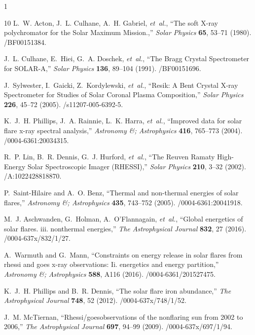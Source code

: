 \documentclass[12pt]{spieman}  %
\newcommand{\solphys}{Solar Physics}
\begin{document}
\begin{spacing}{1}
\begin{thebibliography}{10}
L.~W. {Acton}, J.~L. {Culhane}, A.~H. {Gabriel}, {\em et~al.}, ``{The soft X-ray polychromator for the Solar Maximum Mission.},'' {\em \solphys} {\bf 65}, 53--71  (1980).
/BF00151384.

J.~L. {Culhane}, E.~{Hiei}, G.~A. {Doschek}, {\em et~al.}, ``{The Bragg Crystal Spectrometer for SOLAR-A},'' {\em \solphys} {\bf 136}, 89--104  (1991).
/BF00151696.

J.~{Sylwester}, I.~{Gaicki}, Z.~{Kordylewski}, {\em et~al.}, ``{Resik: A Bent Crystal X-ray Spectrometer for Studies of Solar Coronal Plasma Composition},'' {\em \solphys} {\bf 226}, 45--72  (2005).
/s11207-005-6392-5.

K.~J.~H. Phillips, J.~A. Rainnie, L.~K. Harra, {\em et~al.}, ``Improved data for solar flare x-ray spectral analysis,'' {\em Astronomy \&; Astrophysics} {\bf 416}, 765–773  (2004).
/0004-6361:20034315.

R.~P. {Lin}, B.~R. {Dennis}, G.~J. {Hurford}, {\em et~al.}, ``{The Reuven Ramaty High-Energy Solar Spectroscopic Imager (RHESSI)},'' {\em \solphys} {\bf 210}, 3--32  (2002).
/A:1022428818870.

P.~Saint-Hilaire and A.~O. Benz, ``Thermal and non-thermal energies of solar flares,'' {\em Astronomy \&; Astrophysics} {\bf 435}, 743–752  (2005).
/0004-6361:20041918.

M.~J. Aschwanden, G.~Holman, A.~O’Flannagain, {\em et~al.}, ``Global energetics of solar flares. iii. nonthermal energies,'' {\em The Astrophysical Journal} {\bf 832}, 27  (2016).
/0004-637x/832/1/27.

A.~Warmuth and G.~Mann, ``Constraints on energy release in solar flares from rhessi and goes x-ray observations: Ii. energetics and energy partition,'' {\em Astronomy \&; Astrophysics} {\bf 588}, A116  (2016).
/0004-6361/201527475.

K.~J.~H. Phillips and B.~R. Dennis, ``The solar flare iron abundance,'' {\em The Astrophysical Journal} {\bf 748}, 52  (2012).
/0004-637x/748/1/52.

J.~M. McTiernan, ``Rhessi/goesobservations of the nonflaring sun from 2002 to 2006,'' {\em The Astrophysical Journal} {\bf 697}, 94–99  (2009).
/0004-637x/697/1/94.


\end{thebibliography}
\end{spacing}
\end{document}

